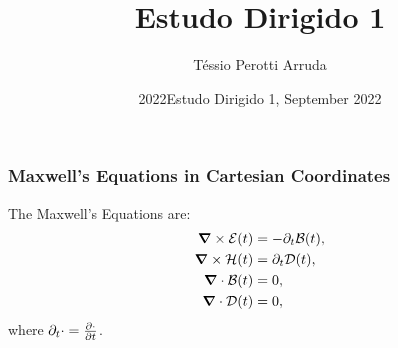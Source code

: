 \documentclass{beamer}
\title{Estudo Dirigido 1}
\author{Téssio Perotti Arruda}
\institute{UnB}
\date{2022}
\institute[UnB] %
{
  \inst{1}%
  Electrical Engineer\\
  University of Brasilia
}
\date[ED 2022.1] %
{Estudo Dirigido 1, September 2022}
\begin{document}
\frame{\titlepage}

\begin{frame}
\frametitle{Maxwell's Equations in Cartesian Coordinates}
The Maxwell's Equations are:
\begin{align*}
    \bm{\nabla}\times \mathcal{E}(t) &= -\partial _t \mathcal{B}(t), \\
    \bm{\nabla}\times \mathcal{H}(t) &= \partial_t \mathcal{D}(t), \\
    \bm{\nabla}\cdot \mathcal{B}(t) &= 0, \\
    \bm{\nabla}\cdot \mathcal{D}(t) &= 0,
\end{align*}
where $\partial_t\cdot = \frac{\partial \cdot}{\partial t}$.
\end{frame}
\end{document}
